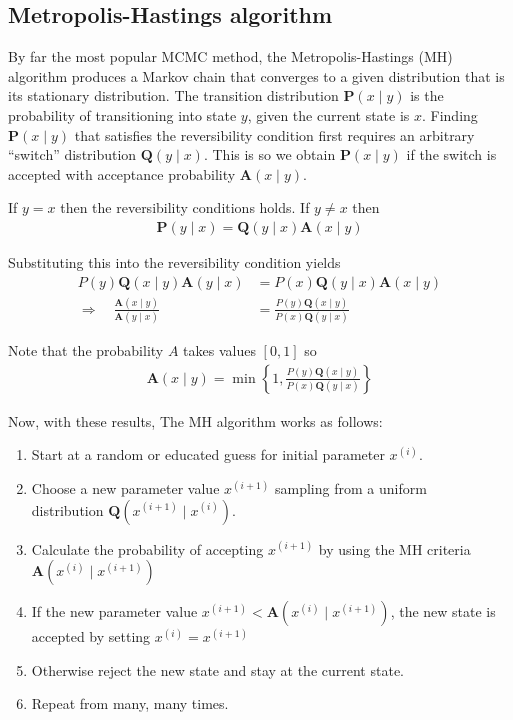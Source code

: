 \documentclass[12pt,twoside]{report}   %
\begin{document}
\subsection{Metropolis-Hastings algorithm}\label{Metropolis-Hastings algorithm}

By far the most popular MCMC method, the Metropolis-Hastings (MH) algorithm produces a Markov chain that converges to a given distribution that is its stationary distribution. The transition distribution $\textbf{P}(x\mid y)$ is the probability of transitioning into state $y$, given the current state is $x$. Finding $\textbf{P}(x\mid y)$ that satisfies the reversibility condition first requires an arbitrary ``switch'' distribution $\textbf{Q}(y\mid x)$. This is so we obtain $\textbf{P}(x\mid y)$ if the switch is accepted with acceptance probability $\textbf{A}(x\mid y)$.

If $y=x$ then the reversibility conditions holds. If $y\neq x$ then
\begin{align*}
\textbf{P}(y\mid x) = \textbf{Q}(y\mid x)\textbf{A}(x\mid y)
\end{align*}

Substituting this into the reversibility condition yields
\begin{align*}
P(y)\textbf{Q}(x\mid y)\textbf{A}(y\mid x) &= P(x)\textbf{Q}(y\mid x)\textbf{A}(x\mid y)\\
\Rightarrow\quad\frac{\textbf{A}(x\mid y)}{\textbf{A}(y\mid x)} &= \frac{P(y)\textbf{Q}(x\mid y)}{P(x)\textbf{Q}(y\mid x)}
\end{align*}

Note that the probability $A$ takes values $[0,1]$ so
\begin{align*}
\textbf{A}(x\mid y) = \min\left\{1, \frac{P(y)\textbf{Q}(x\mid y)}{P(x)\textbf{Q}(y\mid x)}\right\}
\end{align*}

Now, with these results, The MH algorithm works as follows:
\begin{enumerate}
\item Start at a random or educated guess for initial parameter $x^{(i)}$.
\item Choose a new parameter value $x^{(i+1)}$ sampling from a uniform\\ distribution $\textbf{Q}\left(x^{(i+1)}\mid x^{(i)}\right)$.
\item Calculate the probability of accepting $x^{(i+1)}$ by using the MH criteria $\textbf{A}\left(x^{(i)}\mid x^{(i+1)}\right)$
\item If the new parameter value $x^{(i+1)} < \textbf{A}\left(x^{(i)}\mid x^{(i+1)}\right)$, the new state is accepted by setting $x^{(i)} = x^{(i+1)}$
\item Otherwise reject the new state and stay at the current state.
\item Repeat from many, many times.
\end{enumerate}
\end{document}
